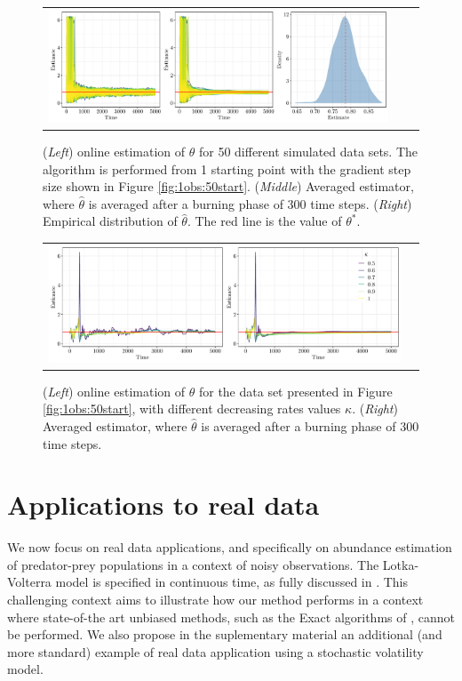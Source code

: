 \documentclass[12pt]{article}
\newcommand{\parvec}{\theta}
\newcounter{example}[section]
\begin{document}
\begin{figure}
\centering
\begin{tabular}{ccc}
\includegraphics[width = \textwidth]{Figure5.pdf}
\end{tabular}
\caption{\label{fig:50obs:1start}(\textit{Left}) online estimation of $\parvec$ for 50 different simulated data sets. The algorithm is performed from 1 starting point with the gradient step size shown in Figure \ref{fig:1obs:50start}. (\textit{Middle}) Averaged estimator, where $\hat{\parvec}$ is averaged after a burning phase of 300 time steps. (\textit{Right}) Empirical distribution of $\hat{\parvec}$. The red line is the value of $\parvec^*$.}
\end{figure}

\begin{figure}
\centering
\begin{tabular}{cc}
\includegraphics[height = .333\textwidth]{Figure6.pdf}
\end{tabular}
\caption{\label{fig:1obs:1start:6Grads}(\textit{Left}) online estimation of $\theta$ for the data set presented in Figure \ref{fig:1obs:50start}, with different decreasing rates values $\kappa$. (\textit{Right}) Averaged estimator, where $\hat{\parvec}$ is averaged after a burning phase of 300 time steps.}
\end{figure}

 
\section{Applications to real data}
\label{sec:real:data}

We now focus on real data applications, and specifically on abundance estimation of predator-prey populations in a context of noisy observations. 
The Lotka-Volterra model is specified in continuous time, as fully discussed in \cite{hening2018persistence}. 
This challenging context aims to illustrate how our method performs in a context where state-of-the art unbiased methods, such as the Exact algorithms of \cite{beskos2006exact}, cannot be performed.
We also propose in the suplementary material an additional  (and more standard) example of real data application using a stochastic volatility model.
 
\end{document}
